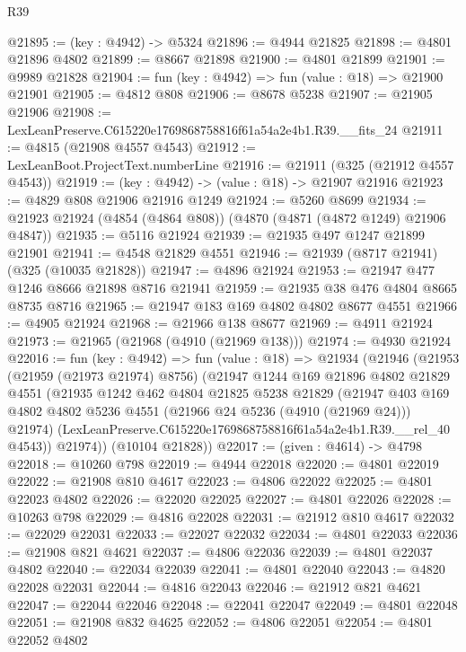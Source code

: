 \begin{lexlean}{R39}
\begin{coremodule}
@21895 := (key : @4942) -> @5324
@21896 := @4944 @21825
@21898 := @4801 @21896 @4802
@21899 := @8667 @21898
@21900 := @4801 @21899
@21901 := @9989 @21828
@21904 := fun (key : @4942) => fun (value : @18) => @21900 @21901
@21905 := @4812 @808
@21906 := @8678 @5238
@21907 := @21905 @21906
@21908 := LexLeanPreserve.C615220e1769868758816f61a54a2e4b1.R39.__fits_24
@21911 := @4815 (@21908 @4557 @4543)
@21912 := LexLeanBoot.ProjectText.numberLine
@21916 := @21911 (@325 (@21912 @4557 @4543))
@21919 := (key : @4942) -> (value : @18) -> @21907 @21916
@21923 := @4829 @808 @21906 @21916 @1249
@21924 := @5260 @8699
@21934 := @21923 @21924 (@4854 (@4864 @808)) (@4870 (@4871 (@4872 @1249) @21906 @4847))
@21935 := @5116 @21924
@21939 := @21935 @497 @1247 @21899 @21901
@21941 := @4548 @21829 @4551
@21946 := @21939 (@8717 @21941) (@325 (@10035 @21828))
@21947 := @4896 @21924
@21953 := @21947 @477 @1246 @8666 @21898 @8716 @21941
@21959 := @21935 @38 @476 @4804 @8665 @8735 @8716
@21965 := @21947 @183 @169 @4802 @4802 @8677 @4551
@21966 := @4905 @21924
@21968 := @21966 @138 @8677
@21969 := @4911 @21924
@21973 := @21965 (@21968 (@4910 (@21969 @138)))
@21974 := @4930 @21924
@22016 := fun (key : @4942) =>
  fun (value : @18) =>
  @21934
    (@21946
      (@21953
        (@21959 (@21973 @21974) @8756)
        (@21947
          @1244
          @169
          @21896
          @4802
          @21829
          @4551
          (@21935
            @1242
            @462
            @4804
            @21825
            @5238
            @21829
            (@21947
              @403
              @169
              @4802
              @4802
              @5236
              @4551
              (@21966 @24 @5236 (@4910 (@21969 @24)))
              @21974)
            (LexLeanPreserve.C615220e1769868758816f61a54a2e4b1.R39.__rel_40 @4543))
          @21974))
      (@10104 @21828))
@22017 := (given : @4614) -> @4798
@22018 := @10260 @798
@22019 := @4944 @22018
@22020 := @4801 @22019
@22022 := @21908 @810 @4617
@22023 := @4806 @22022
@22025 := @4801 @22023 @4802
@22026 := @22020 @22025
@22027 := @4801 @22026
@22028 := @10263 @798
@22029 := @4816 @22028
@22031 := @21912 @810 @4617
@22032 := @22029 @22031
@22033 := @22027 @22032
@22034 := @4801 @22033
@22036 := @21908 @821 @4621
@22037 := @4806 @22036
@22039 := @4801 @22037 @4802
@22040 := @22034 @22039
@22041 := @4801 @22040
@22043 := @4820 @22028 @22031
@22044 := @4816 @22043
@22046 := @21912 @821 @4621
@22047 := @22044 @22046
@22048 := @22041 @22047
@22049 := @4801 @22048
@22051 := @21908 @832 @4625
@22052 := @4806 @22051
@22054 := @4801 @22052 @4802

\end{coremodule}
\end{lexlean}
